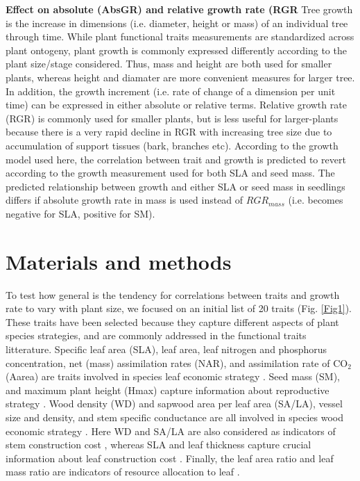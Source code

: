 \documentclass[a4paper]{article}\usepackage[]{graphicx}\usepackage[]{color}
\begin{document}
\textbf{Effect on absolute (AbsGR) and relative growth rate (RGR}
Tree growth is the increase in dimensions (i.e. diameter, height or mass) of an individual tree through time. While plant functional traits measurements are standardized across plant ontogeny, plant growth is commonly expressed differently according to the plant size/stage considered. Thus, mass and height are both used for smaller plants, whereas height and diamater are more convenient measures for larger tree. In addition, the growth increment (i.e. rate of change of a dimension per unit time) can be expressed in either absolute or relative terms. Relative growth rate (RGR) is commonly used for smaller plants, but is less useful for larger-plants because there is a very rapid decline in RGR with increasing tree size due to accumulation of support tissues (bark, branches etc). According to the growth model used here, the correlation between trait and growth is predicted to revert according to the growth measurement used for both SLA and seed mass. The predicted relationship between growth and either SLA or seed mass in seedlings differs if absolute growth rate in mass is used instead of $RGR_{mass}$ (i.e. becomes negative for SLA, positive for SM). 


\section*{Materials and methods}\label{material-and-methods}

To test how general is the tendency for correlations between traits and growth rate to vary with plant size, we focused on an initial list of 20 traits (Fig. \ref{Fig1}). These traits have been selected because they capture different aspects of plant species strategies, and are commonly addressed in the functional traits litterature. Specific leaf area (SLA), leaf area, leaf nitrogen and phosphorus concentration, net (mass) assimilation rates (NAR), and assimilation rate of CO$_2$ (Aarea) are traits involved in species leaf economic strategy \citep{Wright:2004jb,Wright:2010tp}. Seed mass (SM), and maximum plant height (Hmax) capture information about reproductive strategy \citep{Falster:2005bw,Moles:2006ft}. Wood density (WD) and sapwood area per leaf area (SA/LA), vessel size and density, and stem specific conductance are all involved in species wood economic strategy \citep{Chave:2009iy}. Here WD and SA/LA are also considered as indicators of stem construction cost \citep{Falster:2011ii}, whereas SLA and leaf thickness capture crucial information about leaf construction cost \citep{Wright:2004jb}. Finally, the leaf area ratio and leaf mass ratio are indicators of resource allocation to leaf \citep{Lambers:1992bj}.
\end{document}
